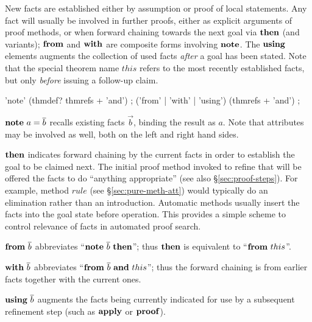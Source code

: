 New facts are established either by assumption or proof of local statements.
Any fact will usually be involved in further proofs, either as explicit
arguments of proof methods, or when forward chaining towards the next goal via
${\mathord{\mathbf{then}}}$ (and variants); ${\mathord{\mathbf{from}}}$ and ${\mathord{\mathbf{with}}}$ are composite forms
involving ${\mathord{\mathbf{note}}}$.  The ${\mathord{\mathbf{using}}}$ elements augments the collection of
used facts \emph{after} a goal has been stated.  Note that the special theorem
name $this$ refers to the most recently established facts,
but only \emph{before} issuing a follow-up claim.

\begin{rail}
  'note' (thmdef? thmrefs + 'and')
  ;
  ('from' | 'with' | 'using') (thmrefs + 'and')
  ;
\end{rail}

\begin{descr}

\item [$\NOTE{a}{\vec b}$] recalls existing facts $\vec b$, binding the result
  as $a$.  Note that attributes may be involved as well, both on the left and
  right hand sides.

\item [${\mathord{\mathbf{then}}}$] indicates forward chaining by the current facts in order to
  establish the goal to be claimed next.  The initial proof method invoked to
  refine that will be offered the facts to do ``anything appropriate'' (see
  also \S\ref{sec:proof-steps}).  For example, method $rule$ (see
  \S\ref{sec:pure-meth-att}) would typically do an elimination rather than an
  introduction.  Automatic methods usually insert the facts into the goal
  state before operation.  This provides a simple scheme to control relevance
  of facts in automated proof search.
  
\item [${\mathord{\mathbf{from}}}~\overline{b}$] abbreviates ``$\NOTE{}{\vec b}~\THEN$''; thus ${\mathord{\mathbf{then}}}$
  is equivalent to ``${\mathord{\mathbf{from}}}~this$''.
  
\item [${\mathord{\mathbf{with}}}~\overline{b}$] abbreviates ``${\mathord{\mathbf{from}}}~\overline{b}~{\mathord{\mathbf{and}}}~this$''; thus the
  forward chaining is from earlier facts together with the current ones.
  
\item [${\mathord{\mathbf{using}}}~\overline{b}$] augments the facts being currently indicated for use
  by a subsequent refinement step (such as ${\mathord{\mathbf{apply}}}$ or ${\mathord{\mathbf{proof}}}$).

\end{descr}


